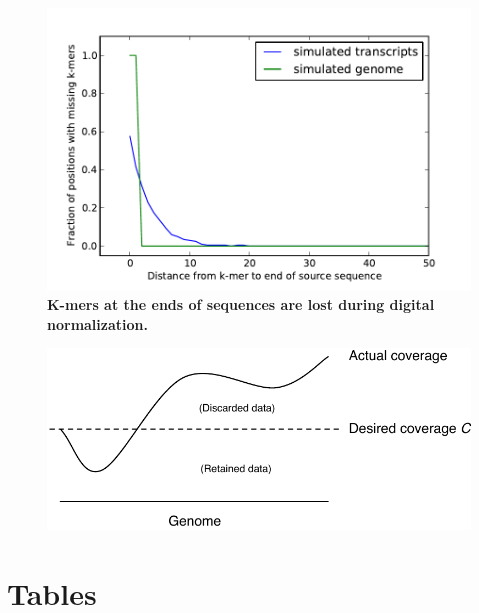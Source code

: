 \documentclass{pnastwo}
\begin{document}
\begin{figure}
\centerline{\includegraphics[width=5in]{diginorm-endbias.pdf}}
\caption{
{\bf K-mers at the ends of sequences are lost during digital normalization.}}
\label{fig:endloss}
\end{figure}

\begin{figure}
\centerline{\includegraphics[width=5in]{schematic.pdf}}
\caption{}
\label{fig:schematic}
\end{figure}

\section*{Tables}
\end{document}
